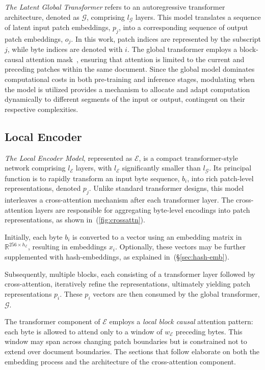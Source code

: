 \textit{The Latent Global Transformer} refers to an autoregressive transformer architecture, denoted as $\mathcal{G}$, comprising $l_{\mathcal{G}}$ layers. This model translates a sequence of latent input patch embeddings, $p_j$, into a corresponding sequence of output patch embeddings, $o_j$. In this work, patch indices are represented by the subscript $j$, while byte indices are denoted with $i$. The global transformer employs a block-causal attention mask~\citep{dubey2024llama}, ensuring that attention is limited to the current and preceding patches within the same document. Since the global model dominates computational costs in both pre-training and inference stages, modulating when the model is utilized provides a mechanism to allocate and adapt computation dynamically to different segments of the input or output, contingent on their respective complexities.

\subsection{Local Encoder}
\label{section:local}

\textit{The Local Encoder Model}, represented as $\mathcal{E}$, is a compact transformer-style network comprising $l_{\mathcal{E}}$ layers, with $l_{\mathcal{E}}$ significantly smaller than $l_{\mathcal{G}}$. Its principal function is to rapidly transform an input byte sequence, $b_i$, into rich patch-level representations, denoted $p_j$. Unlike standard transformer designs, this model interleaves a cross-attention mechanism after each transformer layer. The cross-attention layers are responsible for aggregating byte-level encodings into patch representations, as shown in~(\autoref{fig:crossattn}).

Initially, each byte $b_i$ is converted to a vector using an embedding matrix in $\mathbb{R}^{256 \times h_{\mathcal{E}}}$, resulting in embeddings $x_i$. Optionally, these vectors may be further supplemented with hash-embeddings, as explained in~(\S\ref{sec:hash-emb}).

Subsequently, multiple blocks, each consisting of a transformer layer followed by cross-attention, iteratively refine the representations, ultimately yielding patch representations $p_i$. These $p_i$ vectors are then consumed by the global transformer, $\mathcal{G}$.

The transformer component of $\mathcal{E}$ employs a \textit{local block causal} attention pattern: each byte is allowed to attend only to a window of $w_{\mathcal{E}}$ preceding bytes. This window may span across changing patch boundaries but is constrained not to extend over document boundaries. The sections that follow elaborate on both the embedding process and the architecture of the cross-attention component.

